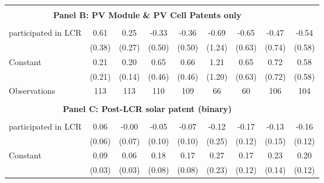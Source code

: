 \begin{table}[htbp]
\begin{tabular}{l*{8}{c}}
\hline \\ \multicolumn{8}{c}{\textbf{Panel B: PV Module \& PV Cell Patents only}} \\\\[-1ex]
participated in LCR &        0.61         &        0.25         &       -0.33         &       -0.36         &       -0.69         &       -0.65         &       -0.47         &       -0.54         \\
                    &      (0.38)         &      (0.27)         &      (0.50)         &      (0.50)         &      (1.24)         &      (0.63)         &      (0.74)         &      (0.58)         \\
[1em]
Constant            &        0.21         &        0.20         &        0.65         &        0.66         &        1.21         &        0.65         &        0.72         &        0.58         \\
                    &      (0.21)         &      (0.14)         &      (0.46)         &      (0.46)         &      (1.20)         &      (0.63)         &      (0.72)         &      (0.58)         \\
\hline
Observations        &         113         &         113         &         110         &         109         &          66         &          60         &         106         &         104         \\
\hline \\ \multicolumn{8}{c}{\textbf{Panel C: Post-LCR solar patent (binary)}} \\\\[-1ex]
participated in LCR &        0.06         &       -0.00         &       -0.05         &       -0.07         &       -0.12         &       -0.17         &       -0.13         &       -0.16         \\
                    &      (0.06)         &      (0.07)         &      (0.10)         &      (0.10)         &      (0.25)         &      (0.12)         &      (0.15)         &      (0.12)         \\
[1em]
Constant            &        0.09\sym{**} &        0.06\sym{*}  &        0.18\sym{**} &        0.17\sym{**} &        0.27         &        0.17         &        0.23\sym{*}  &        0.20\sym{*}  \\
                    &      (0.03)         &      (0.03)         &      (0.08)         &      (0.08)         &      (0.23)         &      (0.12)         &      (0.14)         &      (0.12)         \\
\hline

\end{tabular}
\end{table}
